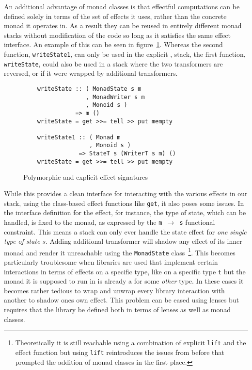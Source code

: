 An additional advantage of monad classes is that effectful computations can be
defined solely in terms of the set of effects it uses, rather than the concrete
monad it operates in. As a result they can be reused in entirely different monad
stacks without modification of the code so long as it satisfies the same effect
interface. An example of this can be seen in figure~\ref{fig:monad-class-poly}.
Whereas the second function, \texttt{writeState1}, can only be used in the
explicit \StateT{}, \WriterT{} stack, the first function, \texttt{writeState},
could also be used in a stack where the two transformers are reversed, or if it
were wrapped by additional transformers.

\begin{figure}
  \begin{lstlisting}
    writeState :: ( MonadState s m
                  , MonadWriter s m
                  , Monoid s )
               => m ()
    writeState = get >>= tell >> put mempty

    writeState1 :: ( Monad m
                   , Monoid s )
                => StateT s (WriterT s m) ()
    writeState = get >>= tell >> put mempty
  \end{lstlisting}
  \caption{Polymorphic and explicit effect signatures}
  \label{fig:monad-class-poly}
\end{figure}

While this provides a clean interface for interacting with the various effects
in our stack, using the class-based effect functions like \texttt{get}, it also
poses some issues. In the interface definition for the \StateM{} effect, for
instance, the type of state, which can be handled, is fixed to the monad, as
expressed by the \texttt{m $\rightarrow$ s} functional constraint. This means a
stack can only ever handle the state effect for \emph{one single type of state
  $s$}. Adding additional \StateT{} transformer will shadow any \StateM{} effect
of its inner monad and render it unreachable using the \texttt{MonadState}
class~\footnote{Theoretically it is still reachable using a combination of
  explicit \texttt{lift} and the effect function but using \texttt{lift}
  reintroduces the issues from before that prompted the addition of monad
  classes in the first place.}. This becomes particularly troublesome when
libraries are used that implement certain interactions in terms of effects on a
specific type, like \ReaderM{} on a specific type \texttt{t} but the monad it is
supposed to run in is already a \ReaderM{} for some \emph{other} type. In these
cases it becomes rather tedious to wrap and unwrap every library interaction
with another \ReaderT{} to shadow ones own \ReaderM{} effect. This problem can
be eased using lenses but requires that the library be defined both in terms of
lenses as well as monad classes.


